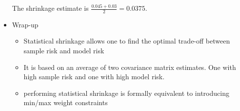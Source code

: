 \documentclass{maths}
\begin{document}
\begin{itemize}
The shrinkage estimate is $\frac{0.045+0.03}{2}=0.0375$. \\

\item Wrap-up
\begin{itemize}
\item Statistical shrinkage allows one to find the optimal trade-off between sample risk and model risk

\item It is based on an average of two covariance matrix estimates. One with high sample risk and one with high model risk.

\item performing statistical shrinkage is formally equivalent to introducing min/max weight constraints 
\end{itemize}

\end{itemize}
\end{document}
